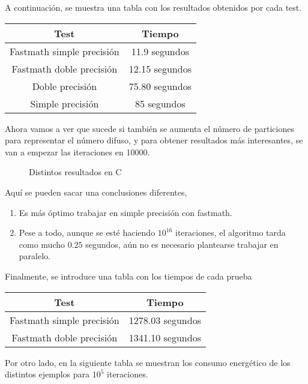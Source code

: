 \begin{ejemplo}
A continuación, se muestra una tabla con los resultados obtenidos por cada test.

\begin{table}[H]
	\centering
	\begin{tabular}{|c|c|}
		\hline
		\textbf{Test}  & \textbf{Tiempo}        \\ \hline
		Fastmath simple precisión & 11.9 segundos \\ 
		Fastmath doble precisión  & 12.15 segundos    \\
		Doble precisión  & 75.80 segundos \\
		Simple precisión    & 85 segundos    \\
		\hline
	\end{tabular}%
\end{table}

Ahora vamos a ver que sucede si también se aumenta el número de particiones para representar el número difuso, y para obtener resultados más interesantes, se van a empezar las iteraciones en 10000.

\begin{figure}[H]
	\centering
	\caption{Distintos resultados en C}
	\label{fig:eulercseq2}
\end{figure}
Aquí se pueden sacar una conclusiones diferentes,
\begin{enumerate}
	\item Es más óptimo trabajar en simple precisión con fastmath.
	
	\item Pese a todo, aunque se esté haciendo $10^{16}$ iteraciones, el algoritmo tarda como mucho $0.25$ segundos, aún no es necesario plantearse trabajar en paralelo.
\end{enumerate}
Finalmente, se introduce una tabla con los tiempos de cada prueba

\begin{table}[H]
	\centering
	\begin{tabular}{|c|c|}
		\hline
		\textbf{Test}  & \textbf{Tiempo}        \\ \hline
		Fastmath simple precisión & 1278.03 segundos \\ 
		Fastmath doble precisión  & 1341.10 segundos  \\ \hline
	\end{tabular}%
\end{table}

Por otro lado, en la siguiente tabla se muestran los consumo energético de los distintos ejemplos para $10^{5}$ iteraciones.


\end{ejemplo}
